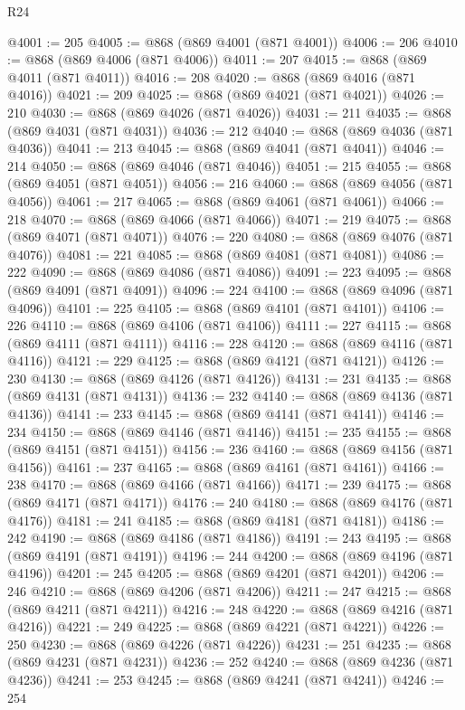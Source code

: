 \begin{lexlean}{R24}
\begin{coremodule}
{{{{{{{{{{{{{{{{{{{{{{{{{{{{{{{{{{{{{{{{{{{{{{{{{{{{{{{{{{{{{{{{{{{{{{{{{{{{{{{{{{{{{{{{{{{{{{{{{{{{{{{{{{{{{{{{{{{{{{{{{{{{{{{{{{{{{{{{{{{{{{{{{{{{{{{{{{{{{{{{{{{{{{{{{{{{{{{{{{{{{{{{{{{{{{{{{{{@4001 := 205
@4005 := @868 (@869 @4001 (@871 @4001))
@4006 := 206
@4010 := @868 (@869 @4006 (@871 @4006))
@4011 := 207
@4015 := @868 (@869 @4011 (@871 @4011))
@4016 := 208
@4020 := @868 (@869 @4016 (@871 @4016))
@4021 := 209
@4025 := @868 (@869 @4021 (@871 @4021))
@4026 := 210
@4030 := @868 (@869 @4026 (@871 @4026))
@4031 := 211
@4035 := @868 (@869 @4031 (@871 @4031))
@4036 := 212
@4040 := @868 (@869 @4036 (@871 @4036))
@4041 := 213
@4045 := @868 (@869 @4041 (@871 @4041))
@4046 := 214
@4050 := @868 (@869 @4046 (@871 @4046))
@4051 := 215
@4055 := @868 (@869 @4051 (@871 @4051))
@4056 := 216
@4060 := @868 (@869 @4056 (@871 @4056))
@4061 := 217
@4065 := @868 (@869 @4061 (@871 @4061))
@4066 := 218
@4070 := @868 (@869 @4066 (@871 @4066))
@4071 := 219
@4075 := @868 (@869 @4071 (@871 @4071))
@4076 := 220
@4080 := @868 (@869 @4076 (@871 @4076))
@4081 := 221
@4085 := @868 (@869 @4081 (@871 @4081))
@4086 := 222
@4090 := @868 (@869 @4086 (@871 @4086))
@4091 := 223
@4095 := @868 (@869 @4091 (@871 @4091))
@4096 := 224
@4100 := @868 (@869 @4096 (@871 @4096))
@4101 := 225
@4105 := @868 (@869 @4101 (@871 @4101))
@4106 := 226
@4110 := @868 (@869 @4106 (@871 @4106))
@4111 := 227
@4115 := @868 (@869 @4111 (@871 @4111))
@4116 := 228
@4120 := @868 (@869 @4116 (@871 @4116))
@4121 := 229
@4125 := @868 (@869 @4121 (@871 @4121))
@4126 := 230
@4130 := @868 (@869 @4126 (@871 @4126))
@4131 := 231
@4135 := @868 (@869 @4131 (@871 @4131))
@4136 := 232
@4140 := @868 (@869 @4136 (@871 @4136))
@4141 := 233
@4145 := @868 (@869 @4141 (@871 @4141))
@4146 := 234
@4150 := @868 (@869 @4146 (@871 @4146))
@4151 := 235
@4155 := @868 (@869 @4151 (@871 @4151))
@4156 := 236
@4160 := @868 (@869 @4156 (@871 @4156))
@4161 := 237
@4165 := @868 (@869 @4161 (@871 @4161))
@4166 := 238
@4170 := @868 (@869 @4166 (@871 @4166))
@4171 := 239
@4175 := @868 (@869 @4171 (@871 @4171))
@4176 := 240
@4180 := @868 (@869 @4176 (@871 @4176))
@4181 := 241
@4185 := @868 (@869 @4181 (@871 @4181))
@4186 := 242
@4190 := @868 (@869 @4186 (@871 @4186))
@4191 := 243
@4195 := @868 (@869 @4191 (@871 @4191))
@4196 := 244
@4200 := @868 (@869 @4196 (@871 @4196))
@4201 := 245
@4205 := @868 (@869 @4201 (@871 @4201))
@4206 := 246
@4210 := @868 (@869 @4206 (@871 @4206))
@4211 := 247
@4215 := @868 (@869 @4211 (@871 @4211))
@4216 := 248
@4220 := @868 (@869 @4216 (@871 @4216))
@4221 := 249
@4225 := @868 (@869 @4221 (@871 @4221))
@4226 := 250
@4230 := @868 (@869 @4226 (@871 @4226))
@4231 := 251
@4235 := @868 (@869 @4231 (@871 @4231))
@4236 := 252
@4240 := @868 (@869 @4236 (@871 @4236))
@4241 := 253
@4245 := @868 (@869 @4241 (@871 @4241))
@4246 := 254
}}}}}}}}}}}}}}}}}}}}}}}}}}}}}}}}}}}}}}}}}}}}}}}}}}}}}}}}}}}}}}}}}}}}}}}}}}}}}}}}}}}}}}}}}}}}}}}}}}}}}}}}}}}}}}}}}}}}}}}}}}}}}}}}}}}}}}}}}}}}}}}}}}}}}}}}}}}}}}}}}}}}}}}}}}}}}}}}}}}}}}}}}}}}}}}}}}}
\end{coremodule}
\end{lexlean}
